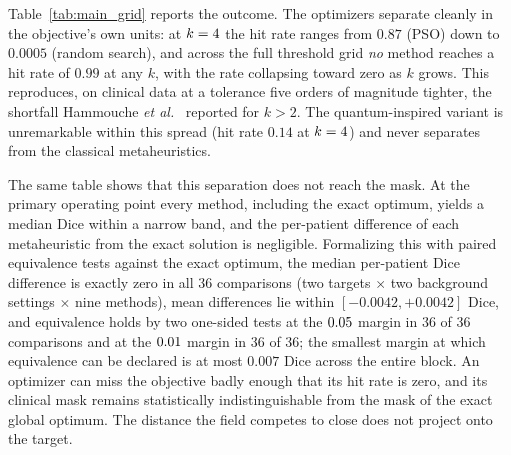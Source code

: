\begin{table}[t]
  \caption{Relative fitness gap to the exact optimum, hit rate, and consumed
  function evaluations, per algorithm at the primary threshold count
  $\kprimary$ with \texttt{brightest} decoding, over $n=368$ patients and five
  seeds. Every metaheuristic consumed exactly the same asserted budget of
  $5{,}000$ evaluations. Dice is the median with a $95\%$ bootstrap CI; the
  exact optimum (DP-exact) has no budget. Mask-identity rate is the fraction of
  (patient, seed) cells in which every metaheuristic returns a byte-identical
  mask.}
  \label{tab:main_grid}
  \centering
\end{table}

Table~\ref{tab:main_grid} reports the outcome. The optimizers separate cleanly in
the objective's own units: at $\kprimary$ the hit rate ranges from $0.87$ (PSO)
down to $0.0005$ (random search), and across the full threshold grid \emph{no}
method reaches a hit rate of $0.99$ at any $k$, with the rate collapsing toward
zero as $k$ grows. This reproduces, on clinical data at a tolerance five orders
of magnitude tighter, the shortfall Hammouche \emph{et al.}~\cite{hammouche_eaai}
reported for $k>2$. The quantum-inspired variant is unremarkable within this
spread (hit rate $0.14$ at $\kprimary$) and never separates from the classical
metaheuristics.

The same table shows that this separation does not reach the mask. At the primary
operating point every method, including the exact optimum, yields a median Dice
within a narrow band, and the per-patient difference of each metaheuristic from
the exact solution is negligible. Formalizing this with paired equivalence tests
against the exact optimum, the median per-patient Dice difference is exactly zero
in all $36$ comparisons (two targets $\times$ two background settings $\times$
nine methods), mean differences lie within $[-0.0042, +0.0042]$ Dice, and
equivalence holds by two one-sided tests at the $0.05$ margin in $36$ of
$36$ comparisons and at the $0.01$ margin in $36$ of $36$; the smallest
margin at which equivalence can be declared is at most $0.007$ Dice across the
entire block. An optimizer can miss the objective badly enough that its hit rate
is zero, and its clinical mask remains statistically indistinguishable from the
mask of the exact global optimum. The distance the field competes to close does
not project onto the target.


